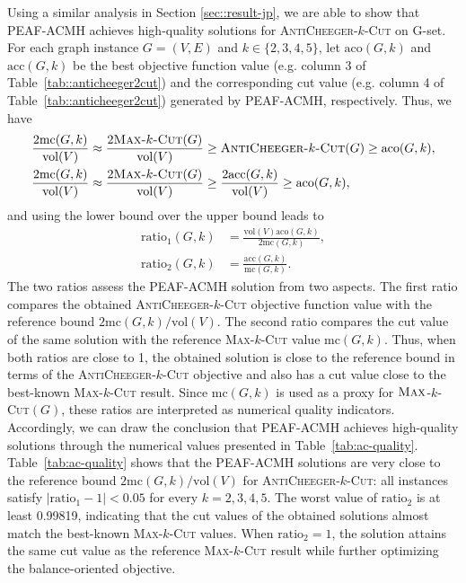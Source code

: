 \documentclass[12pt, a4paper]{article}%
\newcommand{\vol}{\mathrm{vol}}
\numberwithin{equation}{section}
\theoremstyle{plain}
\begin{document}
				Using a similar analysis in Section \ref{sec::result-jp}, we are able to show that PEAF-ACMH achieves high-quality solutions for \textsc{AntiCheeger}-$k$-\textsc{Cut} on G-set. For each graph instance $G=(V,E)$ and $k\in\{2,3,4,5\}$, let $\text{aco}(G,k)$ and $\text{acc}(G,k)$ be the best objective function value (e.g. column 3 of Table~\ref{tab::anticheeger2cut}) and the corresponding cut value (e.g. column 4 of Table~\ref{tab::anticheeger2cut}) generated by PEAF-ACMH, respectively. Thus, we have
				\begin{equation}
					\label{neq:ac}
					\begin{aligned}
						\frac{2\text{mc}(G,k)}{\vol(V)}\approx \frac{2\textsc{Max-}k\textsc{-Cut}(G)}{\vol(V)}&\geq \textsc{AntiCheeger-}k\textsc{-Cut}(G) \geq \text{aco}(G,k),\\
						\frac{2\text{mc}(G,k)}{\vol(V)}\approx \frac{2\textsc{Max-}k\textsc{-Cut}(G)}{\vol(V)}&\geq\frac{2\text{acc}(G,k)}{\vol(V)} \geq \text{aco}(G,k),
					\end{aligned}
				\end{equation}
				and using the lower bound over the upper bound leads to 
				\begin{align}
					\label{ac:ratio1}
					\text{ratio}_1(G,k) &=\frac{\vol(V)\text{aco}(G,k)}{2\text{mc}(G,k)}, \\
					\text{ratio}_2(G,k) &=\frac{\text{acc}(G,k)}{\text{mc}(G,k)}. \label{ac:ratio2}
				\end{align}
{The two ratios assess the PEAF-ACMH solution from two aspects. The first ratio
compares the obtained \textsc{AntiCheeger}-$k$-\textsc{Cut} objective function value
with the reference bound $2\text{mc}(G,k)/\vol(V)$. The second ratio compares
the cut value of the same solution with the reference
\textsc{Max}-$k$-\textsc{Cut} value $\text{mc}(G,k)$. Thus, when both ratios
are close to 1, the obtained solution is close to the reference bound in terms
of the \textsc{AntiCheeger}-$k$-\textsc{Cut} objective and also has a cut value close to the
best-known \textsc{Max}-$k$-\textsc{Cut} result. Since $\text{mc}(G,k)$ is used
as a proxy for $\textsc{Max}$-$k$-\textsc{Cut}$(G)$, these ratios are interpreted
as numerical quality indicators.}
Accordingly, we can draw the conclusion that PEAF-ACMH achieves high-quality solutions through the numerical values presented in Table~\ref{tab:ac-quality}. {Table~\ref{tab:ac-quality} shows that the PEAF-ACMH solutions are very close to the
reference bound $2\text{mc}(G,k)/\vol(V)$ for
\textsc{AntiCheeger}-$k$-\textsc{Cut}: all instances satisfy
$|\text{ratio}_1-1|<0.05$ for every $k=2,3,4,5$. The worst value of
$\text{ratio}_2$ is at least 0.99819, indicating that the cut values of the
obtained solutions almost match the best-known \textsc{Max}-$k$-\textsc{Cut}
values. When $\text{ratio}_2=1$, the solution attains the same cut value as the
reference \textsc{Max}-$k$-\textsc{Cut} result while further optimizing the
balance-oriented objective.}
				
\end{document}
